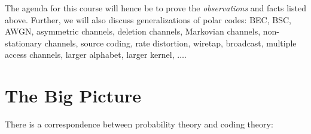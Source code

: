 The agenda for this course will hence be to prove the \textit{observations} and facts listed above. Further, we will also discuss generalizations of polar codes: BEC, BSC, AWGN, asymmetric channels, deletion channels, Markovian channels, non-stationary channels, source coding, rate distortion, wiretap, broadcast, multiple access channels, larger alphabet, larger kernel, $\ldots$.


\section{The Big Picture}
There is a correspondence between probability theory and coding theory:

